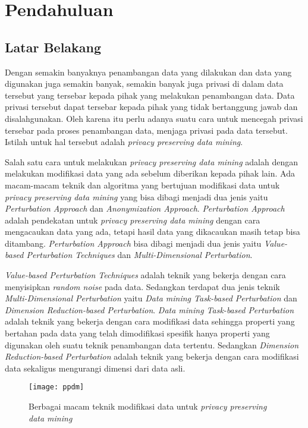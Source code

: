 \chapter{Pendahuluan}
\label{chap:intro}
   
\section{Latar Belakang}
\label{sec:label}
Dengan semakin banyaknya penambangan data yang dilakukan dan data yang digunakan juga semakin banyak, semakin banyak juga privasi di dalam data tersebut yang tersebar kepada pihak yang melakukan penambangan data. Data privasi tersebut dapat tersebar kepada pihak yang tidak bertanggung jawab dan disalahgunakan. Oleh karena itu perlu adanya suatu cara untuk mencegah privasi tersebar pada proses penambangan data, menjaga privasi pada data tersebut. Istilah untuk hal tersebut adalah \textit{privacy preserving data mining}.

Salah satu cara untuk melakukan \textit{privacy preserving data mining} adalah dengan melakukan modifikasi data yang ada sebelum diberikan kepada pihak lain. Ada macam-macam teknik dan algoritma yang bertujuan modifikasi data untuk \textit{privacy preserving data mining} yang bisa dibagi menjadi dua jenis yaitu \textit{Perturbation Approach} dan \textit{Anonymization Approach}. \textit{Perturbation Approach} adalah pendekatan untuk \textit{privacy preserving data mining} dengan cara mengacaukan data yang ada, tetapi hasil data yang dikacaukan masih tetap bisa ditambang. \textit{Perturbation Approach} bisa dibagi menjadi dua jenis yaitu \textit{Value-based Perturbation Techniques} dan \textit{Multi-Dimensional Perturbation}.

\textit{Value-based Perturbation Techniques} adalah teknik yang bekerja dengan cara menyisipkan \textit{random noise} pada data. Sedangkan terdapat dua jenis teknik \textit{Multi-Dimensional Perturbation} yaitu \textit{Data mining Task-based Perturbation} dan \textit{Dimension Reduction-based Perturbation}. \textit{Data mining Task-based Perturbation} adalah teknik yang bekerja dengan cara modifikasi data sehingga properti yang bertahan pada data yang telah dimodifikasi spesifik hanya properti yang digunakan oleh suatu teknik penambangan data tertentu. Sedangkan \textit{Dimension Reduction-based Perturbation} adalah teknik yang bekerja dengan cara modifikasi data sekaligus mengurangi dimensi dari data asli.

\begin{figure}
	\centering
	\texttt{[image: ppdm]}
	\caption{Berbagai macam teknik modifikasi data untuk \textit{privacy preserving data mining}}
	\label{fig:ppdm}
\end{figure}

